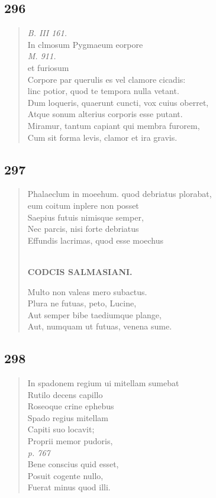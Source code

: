\documentclass[11pt, a4paper]{report}
\begin{document}
            \subsection*{296}
      \begin{verse}
      \textit{B. III 161.} \\ In clmosum Pygmaeum eorpore \\ \textit{M. 911.} \\ et furiosum \\ Corpore par querulis es vel clamore cicadis: \\ linc potior, quod te tempora nulla vetant. \\ Dum loqueris, quaerunt cuncti, vox cuius oberret, \\ Atque sonum alterius corporis esse putant. \\ Miramur, tantum capiant qui membra furorem, \\ Cum sit forma levis, clamor et ira gravis. \\ 
      \end{verse}
  
            \subsection*{297}
      \begin{verse}
      Phalaeclum in moeehum. quod debriatus plorabat, \\ eum coitum inplere non posset \\ Saepius futuis nimisque semper, \\ Nec parcis, nisi forte debriatus \\ Effundis lacrimas, quod esse moechus \\ 
        ﻿\pagebreak 
    \begin{center} \textbf{CODCIS SALMASIANI.} \end{center}Multo non valeas mero subactus. \\ Plura ne futuas, peto, Lucine, \\ Aut semper bibe taediumque plange, \\ Aut, numquam ut futuas, venena sume. \\ 
      \end{verse}
  
            \subsection*{298}
      \begin{verse}
      In spadonem regium ui mitellam sumebat \\ Rutilo decens capillo \\ Roseoque crine ephebus \\ Spado regius mitellam \\ Capiti suo locavit; \\ Proprii memor pudoris, \\ \textit{p. 767} \\ Bene conscius quid esset, \\ Posuit cogente nullo, \\ Fuerat minus quod illi. \\ 
      \end{verse}
  
\end{document}
